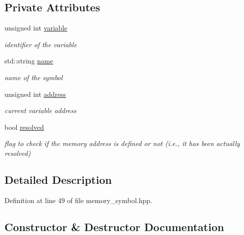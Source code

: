 \subsection*{Private Attributes}
\begin{DoxyCompactItemize}
\item 
unsigned int \hyperlink{classmemory__symbol_ac829259b102b43c0736baf42205b743d}{variable}
\begin{DoxyCompactList}\small\item\em identifier of the variable \end{DoxyCompactList}\item 
std\+::string \hyperlink{classmemory__symbol_ae7444e39e5bb0fdf24f8779507c66833}{name}
\begin{DoxyCompactList}\small\item\em name of the symbol \end{DoxyCompactList}\item 
unsigned int \hyperlink{classmemory__symbol_a2d83272ca53bd6831a35d9d99539bd09}{address}
\begin{DoxyCompactList}\small\item\em current variable address \end{DoxyCompactList}\item 
bool \hyperlink{classmemory__symbol_a8d8725be599300afbaf75eca99391514}{resolved}
\begin{DoxyCompactList}\small\item\em flag to check if the memory address is defined or not (i.\+e., it has been actually resolved) \end{DoxyCompactList}\end{DoxyCompactItemize}


\subsection{Detailed Description}


Definition at line 49 of file memory\+\_\+symbol.\+hpp.



\subsection{Constructor \& Destructor Documentation}
\mbox{\label{classmemory__symbol_af5aff6a6fc83b0d8db9b26c91c2f8784}} 
